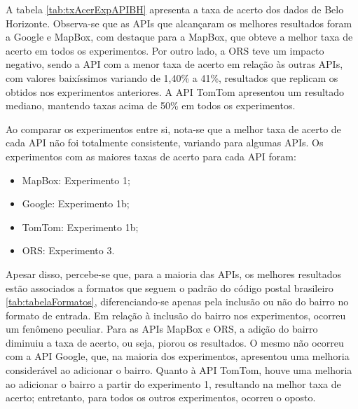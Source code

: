 A tabela \ref{tab:txAcerExpAPIBH} apresenta a taxa de acerto dos dados de Belo Horizonte. Observa-se que as APIs que alcançaram os melhores resultados foram a Google e MapBox, com destaque para a MapBox, que obteve a melhor taxa de acerto em todos os experimentos. Por outro lado, a ORS teve um impacto negativo, sendo a API com a menor taxa de acerto em relação às outras APIs, com valores baixíssimos variando de 1,40\% a 41\%, resultados que replicam os obtidos nos experimentos anteriores. A API TomTom apresentou um resultado mediano, mantendo taxas acima de 50\% em todos os experimentos.

Ao comparar os experimentos entre si, nota-se que a melhor taxa de acerto de cada API não foi totalmente consistente, variando para algumas APIs. Os experimentos com as maiores taxas de acerto para cada API foram:
\begin{itemize}
  \item MapBox: Experimento 1;
  \item Google: Experimento 1b;
  \item TomTom: Experimento 1b;
  \item ORS: Experimento 3.
\end{itemize} 

Apesar disso, percebe-se que, para a maioria das APIs, os melhores resultados estão associados a formatos que seguem o padrão do código postal brasileiro \ref{tab:tabelaFormatos}, diferenciando-se apenas pela inclusão ou não do bairro no formato de entrada. Em relação à inclusão do bairro nos experimentos, ocorreu um fenômeno peculiar. Para as APIs MapBox e ORS, a adição do bairro diminuiu a taxa de acerto, ou seja, piorou os resultados. O mesmo não ocorreu com a API Google, que, na maioria dos experimentos, apresentou uma melhoria considerável ao adicionar o bairro. Quanto à API TomTom, houve uma melhoria ao adicionar o bairro a partir do experimento 1, resultando na melhor taxa de acerto; entretanto, para todos os outros experimentos, ocorreu o oposto.

